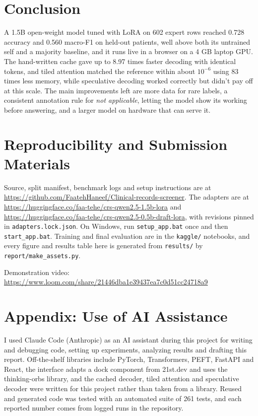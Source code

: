 \documentclass[conference]{IEEEtran}
\begin{document}
\section{Conclusion}

A 1.5B open-weight model tuned with LoRA on 602 expert rows reached 0.728 accuracy and 0.560 macro-F1 on held-out patients, well above both its untrained self and a majority baseline, and it runs live in a browser on a 4 GB laptop GPU. The hand-written cache gave up to 8.97 times faster decoding with identical tokens, and tiled attention matched the reference within about $10^{-6}$ using 83 times less memory, while speculative decoding worked correctly but didn't pay off at this scale. The main improvements left are more data for rare labels, a consistent annotation rule for \emph{not applicable}, letting the model show its working before answering, and a larger model on hardware that can serve it.

\section*{Reproducibility and Submission Materials}

Source, split manifest, benchmark logs and setup instructions are at \url{https://github.com/FaatehHaneef/Clinical-records-screener}. The adapters are at \url{https://huggingface.co/faa-tehe/crs-qwen2.5-1.5b-lora} and \url{https://huggingface.co/faa-tehe/crs-qwen2.5-0.5b-draft-lora}, with revisions pinned in \texttt{adapters.lock.json}. On Windows, run \texttt{setup\_app.bat} once and then \texttt{start\_app.bat}. Training and final evaluation are in the \texttt{kaggle/} notebooks, and every figure and results table here is generated from \texttt{results/} by \texttt{report/make\_assets.py}.

Demonstration video: \url{https://www.loom.com/share/21446dba1e39437ea7c0d51cc24718a9}

\section*{Appendix: Use of AI Assistance}

I used Claude Code (Anthropic) as an AI assistant during this project for writing and debugging code, setting up experiments, analyzing results and drafting this report. Off-the-shelf libraries include PyTorch, Transformers, PEFT, FastAPI and React, the interface adapts a dock component from 21st.dev and uses the thinking-orbs library, and the cached decoder, tiled attention and speculative decoder were written for this project rather than taken from a library. Reused and generated code was tested with an automated suite of 261 tests, and each reported number comes from logged runs in the repository.



\end{document}
